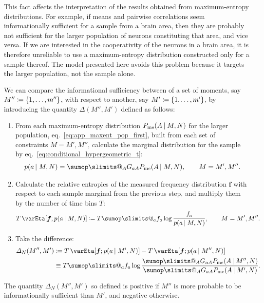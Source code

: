 \documentclass[\ifafour a4paper,12pt,\else a5paper,10pt,\fi%
onecolumn,oneside,article,%
british%
]{memoir}
\makeatletter
\theoremstyle{remark}
\theoremstyle{innote}
\def\sum{\DOTSI\sumop\slimits@}
\newcommand*{\citep}{\footcites}
\newcommand*{\defd}{\coloneqq}
\DeclarePairedDelimiter\set{\{}{\}}
\renewcommand*{\|}{\nonscript\,\vert\nonscript\;\mathopen{}}
\newcommand*{\eqn}{eq.}%
\newcommand*{\eg}{{e.g.}}
\newcommand*{\yG}{G}
\newcommand*{\yAv}{A}
\newcommand*{\yav}{a}
\newcommand*{\yff}{f}
\newcommand*{\yf}{\bm{\yff}}
\newcommand*{\ya}{\yav}%
\newcommand*{\yA}{\yAv}%
\newcommand*{\px}{P_{\text{me}}}
\newcommand*{\pxx}{p}
\newcommand*{\ydi}{\varDelta}
\newcommand*{\sh}{\mathrm{\varEta}}
\makeatother
\begin{document}
This fact affects the interpretation of the results obtained from
maximum-entropy distributions. For example, if means and pairwise
correlations seem informationally sufficient for a sample from a brain
area, then they are probably not sufficient for the larger population of
neurons constituting that area, and vice versa. If we are interested in the
cooperativity of the neurons in a brain area, it is therefore unreliable to
use a maximum-entropy distribution constructed only for a sample
thereof. %
The model presented here avoids this problem because it targets the larger
population, not the sample alone.

\bigskip


We can compare the informational sufficiency between of a set of moments, say
$M''\defd\set{1,\dotsc,m''}$, with respect to another, say
$M'\defd \set{1,\dotsc,m'}$, by introducing the quantity $\ydi(M'',M')$
defined as follows:
\begin{enumerate}[label=(\roman*)]
\item From each maximum-entropy distribution $\px(\yA \| M,N)$ for the
  larger population, \eqn~\eqref{eq:app_maxent_pop_first}, built from each
  set of constraints $M=M',M''$, calculate the marginal distribution for
  the sample by \eqn~\eqref{eq:conditional_hypergeometric_t}:
\begin{equation}
  \label{eq:sample_marginal}
  \pxx(\ya \| M, N) = \sum_{\yA}\yG_{\ya \yA}\px(\yA \| M,N),
  \qquad M=M',M''.
\end{equation}
\item Calculate the relative entropies of the measured frequency
  distribution $\yf$ with respect to each sample marginal from the previous
  step, and multiply them by the number of time bins $T$:
  \begin{equation}
    \label{eq:relentropy_T}
    T\,\sh[\yf; \pxx(\ya \| M,N)] \defd
    T  \sum_{\ya} \yff_{\ya} \log\frac{\yff_{\ya}}{\pxx(\ya \| M,N)},
    \qquad M=M',M''.
  \end{equation}
\item Take the difference: 
\begin{equation}
  \label{eq:measure_suffic}
  \begin{split}
  \ydi_{N}(M'',M') &\defd
  T \,\sh[\yf; \pxx(\ya \| M',N)]
  -
  T \,\sh[\yf; \pxx(\ya \| M'',N)]
  \\ &\equiv
T  \sum_{\ya} \yff_{\ya} \log\frac{
  \sum_{\yA}\yG_{\ya\yA}\px(\yA \| M'',N)}{
  \sum_{\yA}\yG_{\ya\yA}\px(\yA \| M',N)}.
\end{split}
\end{equation}
\end{enumerate}
The quantity $\ydi_{N}(M'',M')$ so defined is positive if $M''$ is more
probable to be informationally sufficient than $M'$, and negative
otherwise.
\end{document}
